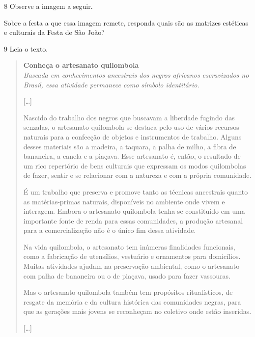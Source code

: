 \num{8}  Observe a imagem a seguir.


Sobre a festa a que essa imagem remete, responda quais são as matrizes estéticas e culturais da Festa de São João?



\num{9} Leia o texto.

\begin{quote}
\textbf{Conheça o artesanato quilombola}\\
\textit{Baseada em conhecimentos ancestrais dos negros africanos escravizados no Brasil, essa atividade permanece como símbolo identitário.}

{[}\ldots{}{]}

Nascido do trabalho dos negros que buscavam a liberdade fugindo das
senzalas, o artesanato quilombola se destaca pelo uso de vários recursos
naturais para a confecção de objetos e instrumentos de trabalho. Alguns
desses materiais são a madeira, a taquara, a palha de milho, a fibra de
bananeira, a canela e a piaçava. Esse artesanato é, então, o resultado
de um rico repertório de bens culturais que expressam os modos
quilombolas de fazer, sentir e se relacionar com a natureza e com a
própria comunidade.

É um trabalho que preserva e promove tanto as técnicas ancestrais quanto
as matérias-primas naturais, disponíveis no ambiente onde vivem e
interagem. Embora o artesanato quilombola tenha se constituído em uma
importante fonte de renda para essas comunidades, a produção artesanal
para a comercialização não é o único fim dessa atividade.

Na vida quilombola, o artesanato tem inúmeras finalidades funcionais,
como a fabricação de utensílios, vestuário e ornamentos para domicílios.
Muitas atividades ajudam na preservação ambiental, como o artesanato com
palha de bananeira ou o de piaçava, usado para fazer vassouras.

Mas o artesanato quilombola também tem propósitos ritualísticos, de
resgate da memória e da cultura histórica das comunidades negras, para
que as gerações mais jovens se reconheçam no coletivo onde estão
inseridas.

{[}\ldots{}{]}

\end{quote}

